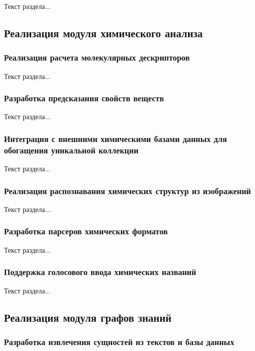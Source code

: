 Текст раздела...

\subsection{Реализация модуля химического анализа}

\subsubsection{Реализация расчета молекулярных дескрипторов}

Текст раздела...

\subsubsection{Разработка предсказания свойств веществ}

Текст раздела...

\subsubsection{Интеграция с внешними химическими базами данных для обогащения уникальной коллекции}

Текст раздела...

\subsubsection{Реализация распознавания химических структур из изображений}

Текст раздела...

\subsubsection{Разработка парсеров химических форматов}

Текст раздела...

\subsubsection{Поддержка голосового ввода химических названий}

Текст раздела...

\subsection{Реализация модуля графов знаний}

\subsubsection{Разработка извлечения сущностей из текстов и базы данных}

